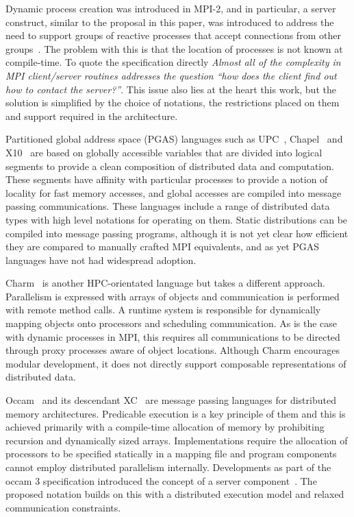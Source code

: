 \documentclass[11pt, conference, compsocconf, onecolumn]{IEEEtran}
\newcounter{process}
\begin{document}
Dynamic process creation was introduced in MPI-2, and in particular, a server
construct, similar to the proposal in this paper, was introduced to address the
need to support groups of reactive processes that accept connections from other
groups~\cite[Sect.~10.4]{MPI2.2}.  The problem with this is that the location
of processes is not known at compile-time. To quote the specification directly
\emph{Almost all of the complexity in MPI client/server routines addresses the
question ``how does the client find out how to contact the server?''}.
This issue also lies at the heart this work, but the solution is simplified by
the choice of notations, the restrictions placed on them and support required
in the architecture.

Partitioned global address space (PGAS) languages such as UPC~\cite{UPC99},
Chapel~\cite{Chapel07} and X10~\cite{X1005} are based on globally accessible
variables that are divided into logical segments to provide a clean composition
of distributed data and computation. These segments have affinity with
particular processes to provide a notion of locality for fast memory accesses,
and global accesses are compiled into message passing communications. 
These languages include a range of distributed data types with high level
notations for operating on them. Static distributions can be compiled into
message passing programs, although it is not yet clear how efficient they are
compared to manually crafted MPI equivalents, and as yet PGAS languages have
not had widespread adoption.

Charm~\cite{Charm95} is another HPC-orientated language but takes a different
approach. Parallelism is expressed with arrays of objects and communication is
performed with remote method calls. A runtime system is responsible for
dynamically mapping objects onto processors and scheduling communication.  As
is the case with dynamic processes in MPI, this requires all communications to
be directed through proxy processes aware of object locations. Although Charm
encourages modular development, it does not directly support composable
representations of distributed data.

Occam~\cite{Occam83} and its descendant XC~\cite{XMOSLang} are message passing
languages for distributed memory architectures.  Predicable execution is a key
principle of them and this is achieved primarily with a compile-time allocation
of memory by prohibiting recursion and dynamically sized arrays.
Implementations require the allocation of processors to be specified
statically in a mapping file and program components cannot employ distributed
parallelism internally.
Developments as part of the occam 3 specification introduced the concept of a
server component~\cite[Chapt.~13]{Occam3Ref}. The proposed notation builds on
this with a distributed execution model and relaxed communication constraints.
\end{document}
